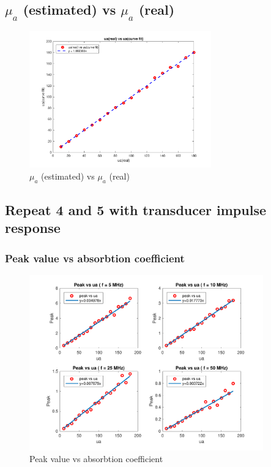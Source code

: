 \documentclass{article}
\begin{document}
\subsection{$\mu_a$ (estimated) vs $\mu_a$ (real)}
\begin{figure}[H]
    \centering
    \includegraphics[width=0.7\textwidth]{src/p1e.pdf}
    \caption{$\mu_a$ (estimated) vs $\mu_a$ (real)}
    \label{fig:p1e}
\end{figure}

\subsection{Repeat 4 and 5 with transducer impulse response}
\subsubsection{Peak value vs absorbtion coefficient}
\begin{figure}[H]
    \centering
    \includegraphics[width=0.9\textwidth]{src/p1f-1.pdf}
    \caption{Peak value vs absorbtion coefficient}
    \label{fig:p1f-1}
\end{figure}
\end{document}
